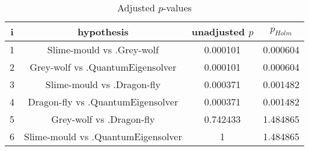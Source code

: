 \documentclass[a4paper,10pt]{article}
\begin{document}
\begin{landscape}
\begin{table}[!htp]
\centering\scriptsize
\begin{tabular}{cccc}
i&hypothesis&unadjusted $p$&$p_{Holm}$\\
\hline1&Slime-mould vs .Grey-wolf&0.000101&0.000604\\
2&Grey-wolf vs .QuantumEigensolver&0.000101&0.000604\\
3&Slime-mould vs .Dragon-fly&0.000371&0.001482\\
4&Dragon-fly vs .QuantumEigensolver&0.000371&0.001482\\
5&Grey-wolf vs .Dragon-fly&0.742433&1.484865\\
6&Slime-mould vs .QuantumEigensolver&1&1.484865\\
\hline
\end{tabular}
\caption{Adjusted $p$-values}
\end{table}

\end{landscape}
\end{document}
